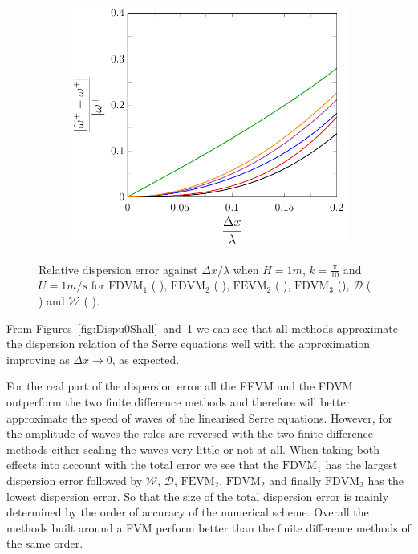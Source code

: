 \begin{figure}
\begin{subfigure}{0.5\textwidth}
	\end{subfigure}
	\par\bigskip
	\begin{subfigure}{0.5\textwidth}
		\includegraphics[width=\textwidth]{./chp4/figures/New/Dispu1Shall.pdf}
	\end{subfigure}
	\caption{Relative dispersion error against $\Delta x / \lambda$ when $H = 1m$, $k = \frac{\pi}{10}$ and $U = 1 m/s$ for $\text{FDVM}_1$ ({\color{green!60!black} \solidrule}), $\text{FDVM}_2$ ({\color{red} \solidrule}), $\text{FEVM}_2$ ({\color{blue} \solidrule}), $\text{FDVM}_3$ ({\solidrule}), $\mathcal{D}$ ({\color{violet!80!white} \solidrule}) and $\mathcal{W}$ ({\color{orange} \solidrule}).}
	\label{fig:Dispu1Shall}
\end{figure}

From Figures~\ref{fig:Dispu0Shall}~and~\ref{fig:Dispu1Shall} we can see that all methods approximate the dispersion relation of the Serre equations well with the approximation improving as $\Delta x \rightarrow 0$, as expected.

For the real part of the dispersion error all the FEVM and the FDVM outperform the two finite difference methods and therefore will better approximate the speed of waves of the linearised Serre equations.  However, for the amplitude of waves the roles are reversed with the two finite difference methods either scaling the waves very little or not at all. When taking both effects into account with the total error we see that the $\text{FDVM}_1$ has the largest dispersion error followed by $\mathcal{W}$, $\mathcal{D}$, $\text{FEVM}_2$, $\text{FDVM}_2$ and finally $\text{FDVM}_3$ has the lowest dispersion error. So that the size of the total dispersion error is mainly determined by the order of accuracy of the numerical scheme. Overall the methods built around a FVM perform better than the finite difference methods of the same order. 

